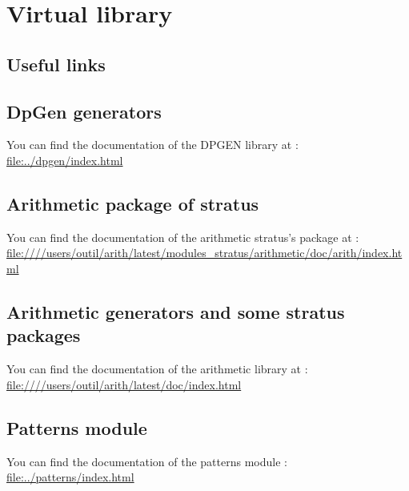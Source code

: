 \documentclass[11pt]{article}
\begin{document}
%
%    
%
%    
%
%    

\section{Virtual library}
\label{seclibrary}


\begin{htmlonly}

\section{Useful links}

    \subsection{DpGen generators}
    
You can find the documentation of the DPGEN library at :\\
\url{file:../dpgen/index.html}

    \subsection{Arithmetic package of stratus}

You can find the documentation of the arithmetic stratus's package at :\\
\url{file:////users/outil/arith/latest/modules_stratus/arithmetic/doc/arith/index.html}

    \subsection{Arithmetic generators and some stratus packages}

You can find the documentation of the arithmetic library at :\\
\url{file:////users/outil/arith/latest/doc/index.html}

    \subsection{Patterns module}
    
You can find the documentation of the patterns module :\\
\url{file:../patterns/index.html}

\end{htmlonly}
\end{document}
